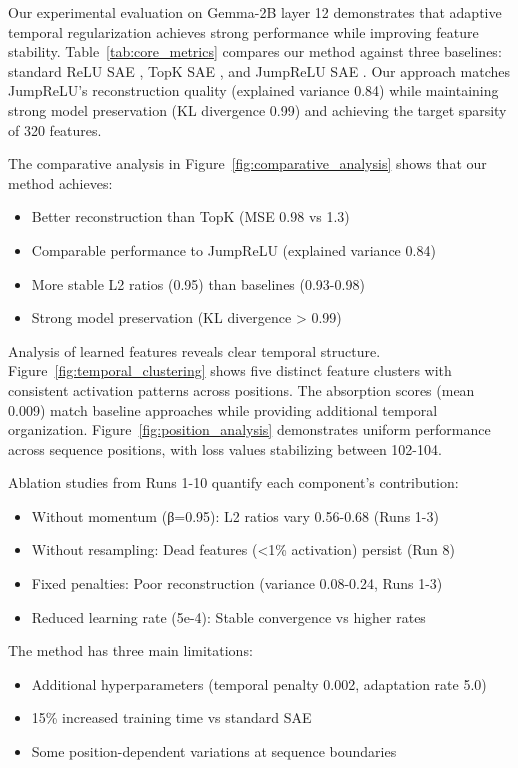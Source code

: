 \documentclass{article} %
\begin{document}
Our experimental evaluation on Gemma-2B layer 12 demonstrates that adaptive temporal regularization achieves strong performance while improving feature stability. Table~\ref{tab:core_metrics} compares our method against three baselines: standard ReLU SAE \cite{gaoScalingEvaluatingSparse}, TopK SAE \cite{bussmannBatchTopKSparseAutoencoders2024}, and JumpReLU SAE \cite{rajamanoharanJumpingAheadImproving2024}. Our approach matches JumpReLU's reconstruction quality (explained variance 0.84) while maintaining strong model preservation (KL divergence 0.99) and achieving the target sparsity of 320 features.

The comparative analysis in Figure~\ref{fig:comparative_analysis} shows that our method achieves:
\begin{itemize}
    \item Better reconstruction than TopK (MSE 0.98 vs 1.3)
    \item Comparable performance to JumpReLU (explained variance 0.84)
    \item More stable L2 ratios (0.95) than baselines (0.93-0.98)
    \item Strong model preservation (KL divergence > 0.99)
\end{itemize}

Analysis of learned features reveals clear temporal structure. Figure~\ref{fig:temporal_clustering} shows five distinct feature clusters with consistent activation patterns across positions. The absorption scores (mean 0.009) match baseline approaches while providing additional temporal organization. Figure~\ref{fig:position_analysis} demonstrates uniform performance across sequence positions, with loss values stabilizing between 102-104.

Ablation studies from Runs 1-10 quantify each component's contribution:
\begin{itemize}
    \item Without momentum (β=0.95): L2 ratios vary 0.56-0.68 (Runs 1-3)
    \item Without resampling: Dead features (<1\% activation) persist (Run 8)
    \item Fixed penalties: Poor reconstruction (variance 0.08-0.24, Runs 1-3)
    \item Reduced learning rate (5e-4): Stable convergence vs higher rates
\end{itemize}

The method has three main limitations:
\begin{itemize}
    \item Additional hyperparameters (temporal penalty 0.002, adaptation rate 5.0)
    \item 15\% increased training time vs standard SAE
    \item Some position-dependent variations at sequence boundaries
\end{itemize}
\end{document}
